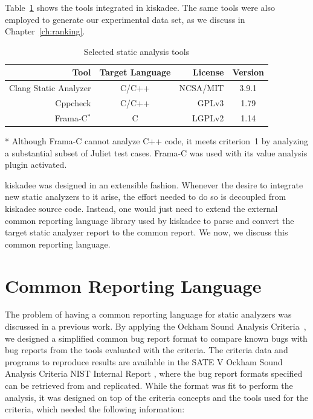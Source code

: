 Table~\ref{tab:selected_tools} shows the tools integrated in kiskadee. The same tools were also employed to generate
our experimental data set, as we discuss in Chapter~\ref{ch:ranking}.

  \begin{table}
    \centering
    \begin{threeparttable}
    \begin{center}
        \begin{tabular}{rcrc}\hline
          Tool & Target Language & License & Version \\
        \hline
          Clang Static Analyzer & C/C++ & NCSA/MIT & 3.9.1\\
          Cppcheck & C/C++ & GPLv3 & 1.79\\
          Frama-C$^{*}$ & C & LGPLv2 & 1.14 \\ \hline
        \end{tabular}
        \begin{tablenotes}
          \small
        \item[*] \footnotesize{Although Frama-C cannot analyze C++ code, it meets criterion~1 by analyzing a substantial subset of Juliet test cases. Frama-C was used with its value analysis plugin activated.}
        \end{tablenotes}
        \caption{Selected static analysis tools}\label{tab:selected_tools}
    \end{center}
    \end{threeparttable}
\end{table}

kiskadee was designed in an extensible fashion. Whenever the desire to
integrate new static analyzers to it arise, the effort needed to do so is
decoupled from kiskadee source code. Instead, one would just need to extend the
external common reporting language library used by kiskadee to parse and
convert the target static analyzer report to the common report. We now, we
discuss this common reporting language.

\section{Common Reporting Language}
\label{sec:firehose}

The problem of having a common reporting language for static analyzers was
discussed in a previous work. By applying the Ockham Sound Analysis
Criteria~\cite{black_sate_2016}, we designed a simplified common bug report
format to compare known bugs with bug reports from the tools evaluated with the
criteria. The criteria data and programs to reproduce results are available in
the SATE V Ockham Sound Analysis Criteria NIST Internal Report
\cite{black_sate_2016}, where the bug report formats specified can be retrieved
from and replicated. While the format was fit to perform the analysis, it was
designed on top of the criteria concepts and the tools used for the criteria,
which needed the following information:


